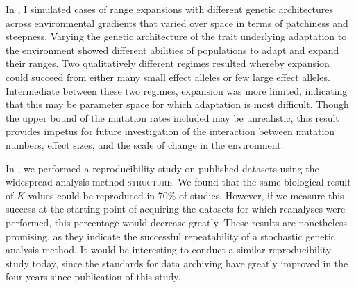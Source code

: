 In , I simulated cases of range expansions with different genetic architectures across environmental gradients that varied over space in terms of patchiness and steepness. Varying the genetic architecture of the trait underlying adaptation to the environment showed different abilities of populations to adapt and expand their ranges. Two qualitatively different regimes resulted whereby expansion could succeed from either many small effect alleles or few large effect alleles. Intermediate between these two regimes, expansion was more limited, indicating that this may be parameter space for which adaptation is most difficult. Though the upper bound of the mutation rates included may be unrealistic, this result provides impetus for future investigation of the interaction between mutation numbers, effect sizes, and the scale of change in the environment.

In , we performed a reproducibility study on published datasets using the widespread analysis method \textsc{structure}. We found that the same biological result of $K$ values could be reproduced in 70\% of studies. However, if we measure this success at the starting point of acquiring the datasets for which reanalyses were performed, this percentage would decrease greatly. These results are nonetheless promising, as they indicate the successful repeatability of a stochastic genetic analysis method. It would be interesting to conduct a similar reproducibility study today, since the standards for data archiving have greatly improved in the four years since publication of this study.




